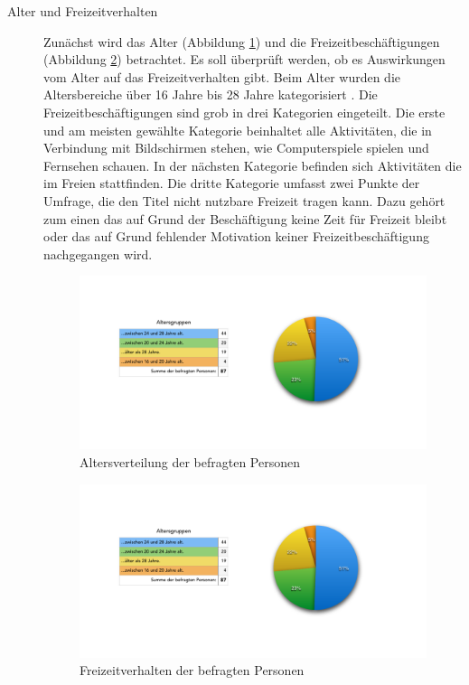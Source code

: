 \begin{description}
\item[Alter und Freizeitverhalten] 
Zunächst wird das Alter (Abbildung \ref{chart:alter}) und die Freizeitbeschäftigungen (Abbildung \ref{chart:freizeit}) betrachtet. Es soll überprüft werden, ob es Auswirkungen vom Alter auf das Freizeitverhalten gibt. Beim Alter wurden die Altersbereiche über 16 Jahre bis 28 Jahre kategorisiert \cite{Statista:TXdt3fYx}. 
Die Freizeitbeschäftigungen sind grob in drei Kategorien eingeteilt. Die erste und am meisten gewählte Kategorie beinhaltet alle Aktivitäten, die in Verbindung mit Bildschirmen stehen, wie Computerspiele spielen und Fernsehen schauen. In der nächsten Kategorie befinden sich Aktivitäten die im Freien stattfinden. Die dritte Kategorie umfasst zwei Punkte der Umfrage, die den Titel nicht nutzbare Freizeit tragen kann. Dazu gehört zum einen das auf Grund der Beschäftigung keine Zeit für Freizeit bleibt oder das auf Grund fehlender Motivation keiner Freizeitbeschäftigung nachgegangen wird. 

\begin{figure}[H]
    \centering
    \includegraphics[trim=40 75 30 70,clip,width=1.2\textwidth, page=1]{files/statistik/umfrage1Ergebnisse.pdf}
    \caption{Altersverteilung der befragten Personen}
    \label{chart:alter}
\end{figure}
\begin{figure}[H]
    \centering
    \includegraphics[trim=40 75 30 70,clip,width=1.2\textwidth, page=2]{files/statistik/umfrage1Ergebnisse.pdf}
    \caption{Freizeitverhalten der befragten Personen}
    \label{chart:freizeit}
\end{figure}




\end{description}
